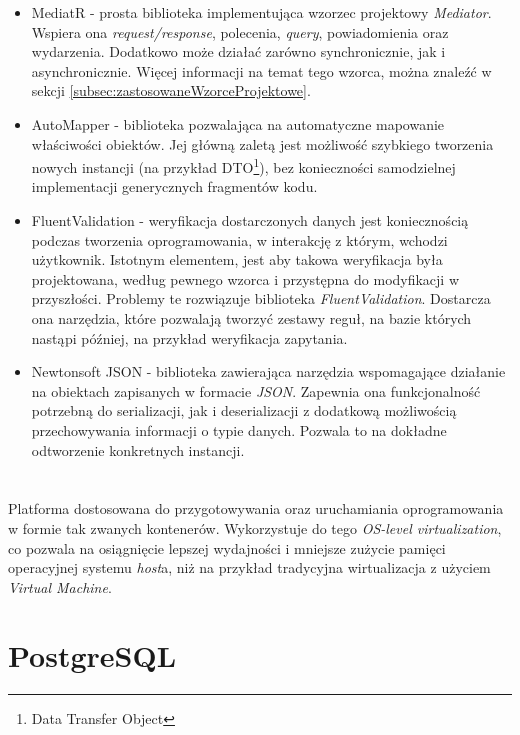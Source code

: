 \begin{itemize}
	\item MediatR - prosta biblioteka implementująca wzorzec projektowy \emph{Mediator}. Wspiera ona \emph{request/response}, polecenia, \emph{query}, powiadomienia oraz wydarzenia. Dodatkowo może działać zarówno synchronicznie, jak i asynchronicznie. Więcej informacji na temat tego wzorca, można znaleźć w sekcji \ref{subsec:zastosowaneWzorceProjektowe}.
	\item AutoMapper - biblioteka pozwalająca na automatyczne mapowanie właściwości obiektów. Jej główną zaletą jest możliwość szybkiego tworzenia nowych instancji (na przykład DTO\footnote{Data Transfer Object}), bez konieczności samodzielnej implementacji generycznych fragmentów kodu.
	\item FluentValidation - weryfikacja dostarczonych danych jest koniecznością podczas tworzenia oprogramowania, w interakcję z którym, wchodzi użytkownik. Istotnym elementem, jest aby takowa weryfikacja była projektowana, według pewnego wzorca i przystępna do modyfikacji w przyszłości. Problemy te rozwiązuje biblioteka \emph{FluentValidation}. Dostarcza ona narzędzia, które pozwalają tworzyć zestawy reguł, na bazie których nastąpi później, na przykład weryfikacja zapytania.
	\item Newtonsoft JSON - biblioteka zawierająca narzędzia wspomagające działanie na obiektach zapisanych w formacie \emph{JSON}. Zapewnia ona funkcjonalność potrzebną do serializacji, jak i deserializacji z dodatkową możliwością przechowywania informacji o typie danych. Pozwala to na dokładne odtworzenie konkretnych instancji.
\end{itemize}

\section{\docker{}}

\par Platforma dostosowana do przygotowywania oraz uruchamiania oprogramowania w formie tak zwanych kontenerów. Wykorzystuje do tego \emph{OS-level virtualization}, co pozwala na osiągnięcie lepszej wydajności i mniejsze zużycie pamięci operacyjnej systemu \emph{host}a, niż na przykład tradycyjna wirtualizacja z użyciem \emph{Virtual Machine}.\cite{DOCKER_DOCUMENTATION}

\section{PostgreSQL}

